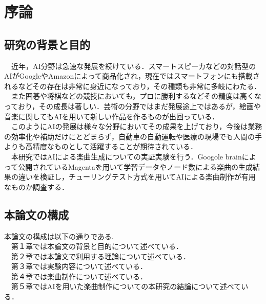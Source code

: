 \chapter{序論}

\section{研究の背景と目的}
　近年，AI分野は急速な発展を続けている．スマートスピーカなどの対話型のAIがGoogleやAmazonによって商品化され，現在ではスマートフォンにも搭載されるなどその存在は非常に身近になっており，その種類も非常に多岐にわたる．\\
　また囲碁や将棋などの競技においても，プロに勝利するなどその精度は高くなっており，その成長は著しい．芸術の分野ではまだ発展途上ではあるが，絵画や音楽に関してもAIを用いて新しい作品を作るものが出回っている．\\
　このようにAIの発展は様々な分野においてその成果を上げており，今後は業務の効率化や補助だけにとどまらず，自動車の自動運転や医療の現場でも人間の手よりも高精度なものとして活躍することが期待されている．\\
　本研究ではAIによる楽曲生成についての実証実験を行う．Googole brainによって公開されているMagentaを用いて学習データやノード数による楽曲の生成結果の違いを検証し，チューリングテスト方式を用いてAIによる楽曲制作が有用なものか調査する．\\



\section{本論文の構成}
本論文の構成は以下の通りである.\\
　第１章では本論文の背景と目的について述べている．\\
　第２章では本論文で利用する理論について述べている．\\
　第３章では実験内容について述べている．\\
　第４章では楽曲制作について述べている．\\
　第５章ではAIを用いた楽曲制作についての本研究の結論について述べている．\\
